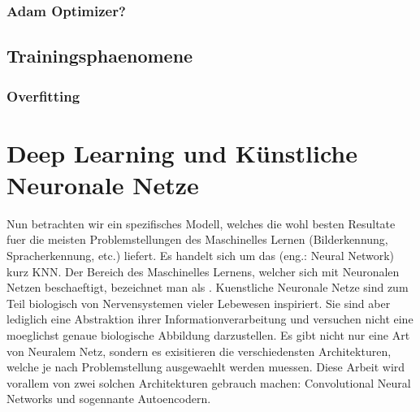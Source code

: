 \subsection{Adam Optimizer?}

\section{Trainingsphaenomene}

\subsection{Overfitting}


\chapter{Deep Learning und Künstliche Neuronale Netze}
Nun betrachten wir ein spezifisches Modell, welches die wohl besten Resultate
fuer die meisten Problemstellungen des Maschinelles Lernen (Bilderkennung,
Spracherkennung, etc.) liefert. Es handelt sich um das  (eng.: Neural Network) kurz KNN.
Der Bereich des Maschinelles Lernens, welcher sich mit Neuronalen Netzen
beschaeftigt, bezeichnet man als .
\para{}
Kuenstliche Neuronale Netze sind zum Teil biologisch von Nervensystemen vieler
Lebewesen inspiriert.
Sie sind aber lediglich eine Abstraktion ihrer Informationverarbeitung und versuchen nicht eine moeglichst genaue biologische Abbildung darzustellen.
Es gibt nicht nur eine Art von Neuralem Netz, sondern es exisitieren die
verschiedensten Architekturen, welche je nach Problemstellung ausgewaehlt werden
muessen. Diese Arbeit wird vorallem von zwei solchen Architekturen gebrauch machen:
Convolutional Neural Networks und sogennante Autoencodern.


